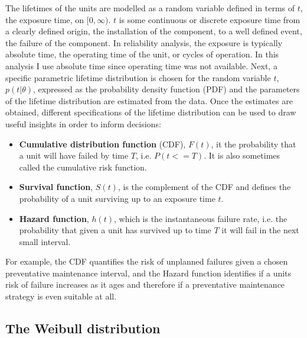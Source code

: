 The lifetimes of the units are modelled as a random variable defined in terms of $t$, the exposure time, on $[0, \infty)$. $t$ is some continuous or discrete exposure time from a clearly defined origin, the installation of the component, to a well defined event, the failure of the component. In reliability analysis, the exposure is typically absolute time, the operating time of the unit, or cycles of operation. In this analysis I use absolute time since operating time was not available. Next, a specific parametric lifetime distribution is chosen for the random variable $t$, $p(t|\theta)$, expressed as the probability density function (PDF) and the parameters of the lifetime distribution are estimated from the data. Once the estimates are obtained, different specifications of the lifetime distribution can be used to draw useful insights in order to inform decisions:
\begin{itemize}
    \item \textbf{Cumulative distribution function} (CDF), $F(t)$, it the probability that a unit will have failed by time $T$, i.e. $P(t <= T)$. It is also sometimes called the cumulative risk function.
    \item \textbf{Survival function}, $S(t)$, is the complement of the CDF and defines the probability of a unit surviving up to an exposure time $t$.
    \item \textbf{Hazard function}, $h(t)$, which is the instantaneous failure rate, i.e. the probability that given a unit has survived up to time $T$ it will fail in the next small interval.
\end{itemize}
For example, the CDF quantifies the risk of unplanned failures given a chosen preventative maintenance interval, and the Hazard function identifies if a units risk of failure increases as it ages and therefore if a preventative maintenance strategy is even suitable at all.

\subsection{The Weibull distribution}

